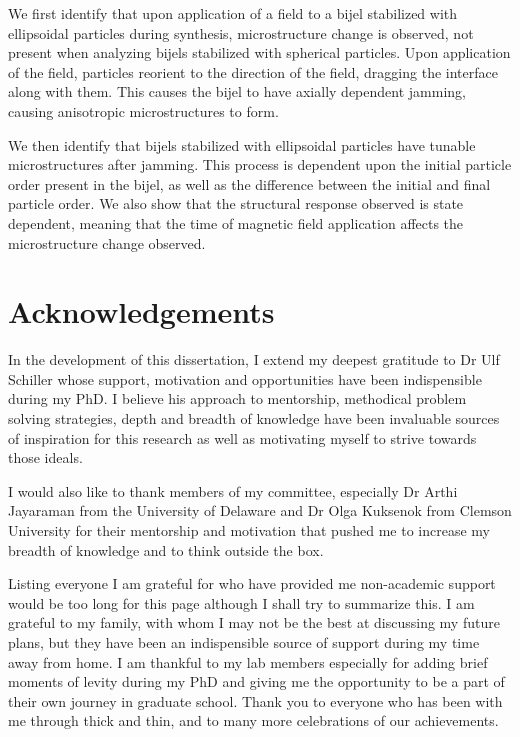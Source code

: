 \documentclass[12pt]{book}
\begin{document}
We first identify that upon application of a field to a bijel stabilized with ellipsoidal particles during synthesis, microstructure change is observed, not present when analyzing bijels stabilized with spherical particles. Upon application of the field, particles reorient to the direction of the field, dragging the interface along with them. This causes the bijel to have axially dependent jamming, causing anisotropic microstructures to form.

We then identify that bijels stabilized with ellipsoidal particles have tunable microstructures after jamming. This process is dependent upon the initial particle order present in the bijel, as well as the difference between the initial and final particle order. We also show that the structural response observed is state dependent, meaning that the time of magnetic field application affects the microstructure change observed.

\newpage

\section*{Acknowledgements}

In the development of this dissertation, I extend my deepest gratitude to Dr Ulf Schiller whose support, motivation and opportunities have been indispensible during my PhD. I believe his approach to mentorship, methodical problem solving strategies, depth and breadth of knowledge have been invaluable sources of inspiration for this research as well as motivating myself to strive towards those ideals.

I would also like to thank members of my committee, especially Dr Arthi Jayaraman from the University of Delaware and Dr Olga Kuksenok from Clemson University for their mentorship and motivation that pushed me to increase my breadth of knowledge and to think outside the box.

Listing everyone I am grateful for who have provided me non-academic support would be too long for this page although I shall try to summarize this. I am grateful to my family, with whom I may not be the best at discussing my future plans, but they have been an indispensible source of support during my time away from home. I am thankful to my lab members especially for adding brief moments of levity during my PhD and giving me the opportunity to be a part of their own journey in graduate school. Thank you to everyone who has been with me through thick and thin, and to many more celebrations of our achievements. 
\end{document}
